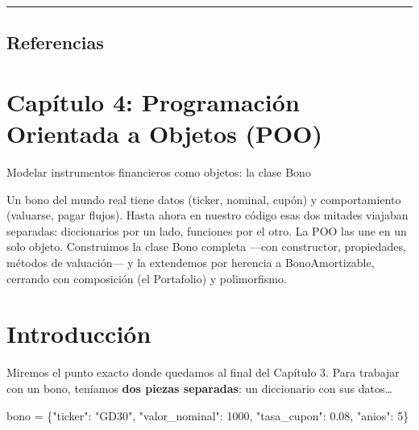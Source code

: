 \documentclass[
  spanish,
  letterpaper,
  DIV=11,
  numbers=noendperiod]{scrreprt}
\newenvironment{Shaded}{\begin{snugshade}}{\end{snugshade}}
\newcommand{\DecValTok}[1]{\textcolor[rgb]{0.68,0.00,0.00}{#1}}
\newcommand{\FloatTok}[1]{\textcolor[rgb]{0.68,0.00,0.00}{#1}}
\newcommand{\NormalTok}[1]{\textcolor[rgb]{0.00,0.23,0.31}{#1}}
\newcommand{\OperatorTok}[1]{\textcolor[rgb]{0.37,0.37,0.37}{#1}}
\newcommand{\StringTok}[1]{\textcolor[rgb]{0.13,0.47,0.30}{#1}}
\begin{document}
\begin{center}\rule{0.5\linewidth}{0.5pt}\end{center}

\section{Referencias}\label{referencias-2}

\label{refs}

\chapter{Capítulo 4: Programación Orientada a Objetos
(POO)}\label{capuxedtulo-4-programaciuxf3n-orientada-a-objetos-poo}

Modelar instrumentos financieros como objetos: la clase Bono

Un bono del mundo real tiene datos (ticker, nominal, cupón) y
comportamiento (valuarse, pagar flujos). Hasta ahora en nuestro código
esas dos mitades viajaban separadas: diccionarios por un lado, funciones
por el otro. La POO las une en un solo objeto. Construimos la clase Bono
completa ---con constructor, propiedades, métodos de valuación--- y la
extendemos por herencia a BonoAmortizable, cerrando con composición (el
Portafolio) y polimorfismo.

\hfill\break

\chapter*{Introducción}\label{introducciuxf3n-3}


Miremos el punto exacto donde quedamos al final del Capítulo 3. Para
trabajar con un bono, teníamos \textbf{dos piezas separadas}: un
diccionario con sus datos\ldots{}

\begin{Shaded}
\begin{Highlighting}[]
\NormalTok{bono }\OperatorTok{=}\NormalTok{ \{}\StringTok{"ticker"}\NormalTok{: }\StringTok{"GD30"}\NormalTok{, }\StringTok{"valor\_nominal"}\NormalTok{: }\DecValTok{1000}\NormalTok{, }\StringTok{"tasa\_cupon"}\NormalTok{: }\FloatTok{0.08}\NormalTok{, }\StringTok{"anios"}\NormalTok{: }\DecValTok{5}\NormalTok{\}}
\end{Highlighting}
\end{Shaded}
\end{document}
